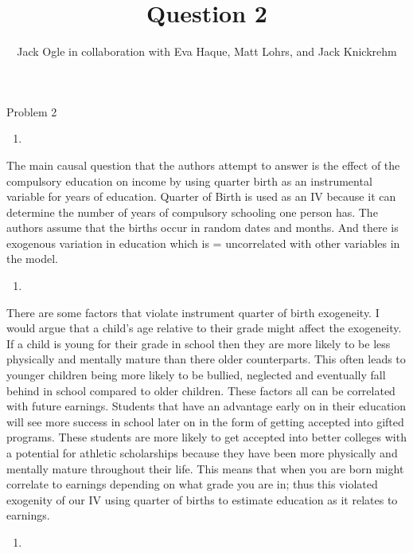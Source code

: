 \documentclass[
  12pt,
  landscape]{article}
\title{Question 2}
\author{Jack Ogle in collaboration with Eva Haque, Matt Lohrs, and Jack
Knickrehm}
\date{}
\begin{document}
\maketitle

Problem 2

\begin{enumerate}
\def\labelenumi{(\alph{enumi})}
\item
\end{enumerate}

The main causal question that the authors attempt to answer is the
effect of the compulsory education on income by using quarter birth as
an instrumental variable for years of education. Quarter of Birth is
used as an IV because it can determine the number of years of compulsory
schooling one person has. The authors assume that the births occur in
random dates and months. And there is exogenous variation in education
which is = uncorrelated with other variables in the model.

\begin{enumerate}
\def\labelenumi{(\alph{enumi})}
\setcounter{enumi}{1}
\item
\end{enumerate}

There are some factors that violate instrument quarter of birth
exogeneity. I would argue that a child's age relative to their grade
might affect the exogeneity. If a child is young for their grade in
school then they are more likely to be less physically and mentally
mature than there older counterparts. This often leads to younger
children being more likely to be bullied, neglected and eventually fall
behind in school compared to older children. These factors all can be
correlated with future earnings. Students that have an advantage early
on in their education will see more success in school later on in the
form of getting accepted into gifted programs. These students are more
likely to get accepted into better colleges with a potential for
athletic scholarships because they have been more physically and
mentally mature throughout their life. This means that when you are born
might correlate to earnings depending on what grade you are in; thus
this violated exogenity of our IV using quarter of births to estimate
education as it relates to earnings.

\begin{enumerate}
\def\labelenumi{(\alph{enumi})}
\setcounter{enumi}{2}
\item
\end{enumerate}
\end{document}
